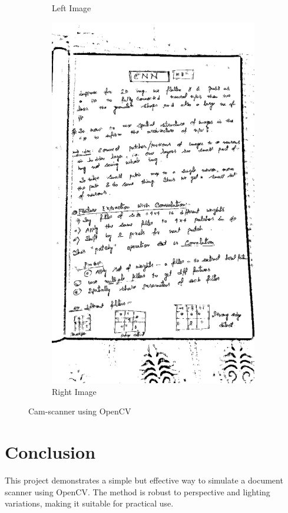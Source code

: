 \documentclass[12pt]{article}
\begin{document}
\begin{figure}[H]
\begin{subfigure}[b]{0.45\textwidth}
        \caption{Left Image}
    \end{subfigure}
    \hfill
    \begin{subfigure}[b]{0.45\textwidth}
        \includegraphics[width=\textwidth]{scanned_output.jpg}
        \caption{Right Image}
    \end{subfigure}
    \caption{Cam-scanner using OpenCV}
\end{figure}


\section{Conclusion}
This project demonstrates a simple but effective way to simulate a document scanner using OpenCV. The method is robust to perspective and lighting variations, making it suitable for practical use.
\end{document}
